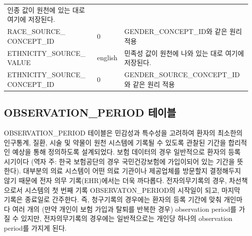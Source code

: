 \documentclass[10.5pt]{book}
\theoremstyle{definition}
\theoremstyle{definition}
\theoremstyle{definition}
\theoremstyle{remark}
\begin{document}
\begin{longtable}[]{@{}lll@{}}
\begin{minipage}[t]{0.48\columnwidth}
인종 값이 원천에 있는 대로 여기에 저장된다.\strut
\end{minipage}\tabularnewline
\begin{minipage}[t]{0.28\columnwidth}\raggedright\strut
RACE\_SOURCE\_ CONCEPT\_ID\strut
\end{minipage} & \begin{minipage}[t]{0.16\columnwidth}\raggedright\strut
0\strut
\end{minipage} & \begin{minipage}[t]{0.48\columnwidth}\raggedright\strut
GENDER\_CONCEPT\_ID와 같은 원리 적용\strut
\end{minipage}\tabularnewline
\begin{minipage}[t]{0.28\columnwidth}\raggedright\strut
ETHNICITY\_SOURCE\_ VALUE\strut
\end{minipage} & \begin{minipage}[t]{0.16\columnwidth}\raggedright\strut
english\strut
\end{minipage} & \begin{minipage}[t]{0.48\columnwidth}\raggedright\strut
민족성 값이 원천에 나와 있는 대로 여기에 저장된다.\strut
\end{minipage}\tabularnewline
\begin{minipage}[t]{0.28\columnwidth}\raggedright\strut
ETHNICITY\_SOURCE\_ CONCEPT\_ID\strut
\end{minipage} & \begin{minipage}[t]{0.16\columnwidth}\raggedright\strut
0\strut
\end{minipage} & \begin{minipage}[t]{0.48\columnwidth}\raggedright\strut
GENDER\_SOURCE\_CONCEPT\_ID와 같은 원리 적용\strut
\end{minipage}\tabularnewline
\bottomrule
\end{longtable}

\subsection{OBSERVATION\_PERIOD 테이블}\label{observationPeriod}

OBSERVATION\_PERIOD 테이블은 민감성과 특수성을 고려하여 환자의 최소한의
인구통계, 질환, 시술 및 약물이 원천 시스템에 기록될 수 있도록 관찰된
기간을 합리적인 예상을 통해 정의하도록 설계되었다. 보험 데이터의 경우
일반적으로 환자의 등록 시기이다 (역자 주: 한국 보험공단의 경우
국민건강보험에 가입이되어 있는 기간을 뜻한다). 대부분의 의료 시스템이
어떤 의료 기관이나 제공업체를 방문할지 결정해두지 않기 때문에 전자 의무
기록(EHR)에서는 더욱 까다롭다. 전자의무기록의 경우, 차선책으로서
시스템의 첫 번째 기록 OBSERVATON\_PERIOD의 시작일이 되고, 마지막 기록은
종료일로 간주한다. 즉, 청구기록의 경우에는 환자의 등록 기간에 맞춰
개인마다 여러 개의 (만약 개인이 보험 가입과 탈퇴를 반복한 경우)
observation period를 가질 수 있지만, 전자의무기록의 경우에는
일반적으로는 개인당 하나의 observation period를 가지게 된다.
\end{document}
